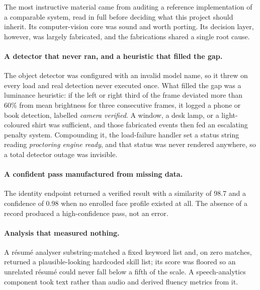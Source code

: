 The most instructive material came from auditing a reference implementation of a
comparable system, read in full before deciding what this project should inherit.
Its computer-vision core was sound and worth porting. Its decision layer, however, was largely fabricated, and the fabrications shared a single root cause.

\paragraph{A detector that never ran, and a heuristic that filled the gap.}
The object detector was configured with an invalid model name, so it threw on
every load and real detection never executed once. What filled the gap was a
luminance heuristic: if the left or right third of the frame deviated more than
60\% from mean brightness for three consecutive frames, it logged a phone or book detection, labelled \emph{camera verified}. A window, a desk lamp, or a light-coloured shirt was sufficient, and those fabricated events then fed an escalating penalty system. Compounding it, the load-failure handler set a status
string reading \emph{proctoring engine ready}, and that status was never rendered
anywhere, so a total detector outage was invisible.

\paragraph{A confident pass manufactured from missing data.}
The identity endpoint returned a verified result with a similarity of 98.7 and a
confidence of 0.98 when no enrolled face profile existed at all. The absence of a record produced a high-confidence pass, not an error.

\paragraph{Analysis that measured nothing.}
A résumé analyser substring-matched a fixed keyword list and, on zero matches,
returned a plausible-looking hardcoded skill list; its score was floored so an
unrelated résumé could never fall below a fifth of the scale. A speech-analytics
component took text rather than audio and derived fluency metrics from it.

